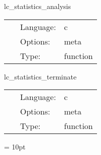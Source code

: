 \vspace{5mm}


\hspace{5mm} lc\_statistics\_analysis 

\hspace{5mm}{\it output loopcontrol statistics } 


\hspace{5mm}

 \begin{tabular*}{160mm}{cll} 
~ & Language:  & c \\ 
~ & Options:  & meta \\ 
~ & Type:  & function \\ 
\end{tabular*} 


\vspace{5mm}


\hspace{5mm} lc\_statistics\_terminate 

\hspace{5mm}{\it output loopcontrol statistics } 


\hspace{5mm}

 \begin{tabular*}{160mm}{cll} 
~ & Language:  & c \\ 
~ & Options:  & meta \\ 
~ & Type:  & function \\ 
\end{tabular*} 



\vspace{5mm}\parskip = 10pt 
